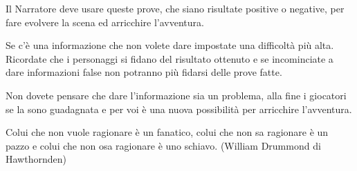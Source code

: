 \begin{multicols}{2}
Il Narratore deve usare queste prove, che siano risultate positive o negative, per fare evolvere la scena ed arricchire l'avventura.

Se c'è una informazione che non volete dare impostate una difficoltà più alta.
Ricordate che i personaggi si fidano del risultato ottenuto e se incominciate a dare informazioni false non potranno più fidarsi delle prove fatte.

Non dovete pensare che dare l'informazione sia un problema, alla fine i giocatori se la sono guadagnata e per voi è una nuova possibilità per arricchire l'avventura.

\end{multicols}

\vfill

\begin{enfasi}{
Colui che non vuole ragionare è un fanatico, colui che non sa ragionare è un pazzo e colui che non osa ragionare è uno schiavo. (William Drummond di Hawthornden)
}\end{enfasi}

\pagebreak

